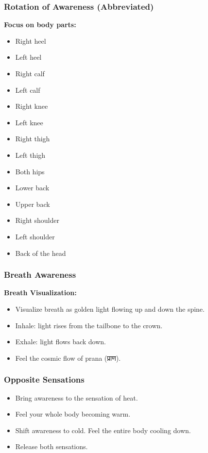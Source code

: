 \begin{frame}[fragile]\frametitle{Rotation of Awareness (Abbreviated)}
    \textbf{Focus on body parts:}

    \begin{itemize}
        \item Right heel
        \item Left heel
        \item Right calf
        \item Left calf
        \item Right knee
        \item Left knee
        \item Right thigh
        \item Left thigh
        \item Both hips
        \item Lower back
        \item Upper back
        \item Right shoulder
        \item Left shoulder
        \item Back of the head
    \end{itemize}
\end{frame}

\begin{frame}[fragile]\frametitle{Breath Awareness}
    \textbf{Breath Visualization:}
    \begin{itemize}
        \item Visualize breath as golden light flowing up and down the spine.
        \item Inhale: light rises from the tailbone to the crown.
        \item Exhale: light flows back down.
        \item Feel the cosmic flow of prana (प्राण).
    \end{itemize}
\end{frame}

\begin{frame}[fragile]\frametitle{Opposite Sensations}
    \begin{itemize}
        \item Bring awareness to the sensation of heat.
        \item Feel your whole body becoming warm.
        \item Shift awareness to cold. Feel the entire body cooling down.
        \item Release both sensations.
    \end{itemize}
\end{frame}

